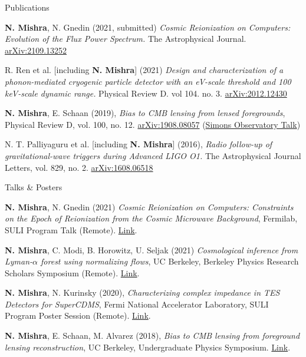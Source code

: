 \documentclass{resume} %
\begin{document}
\newpage

\begin{rSection}{Publications}

\textbf{N. Mishra}, N. Gnedin (2021, submitted) \textit{Cosmic Reionization on Computers: Evolution of the Flux Power Spectrum.} The Astrophysical Journal. \href{https://arxiv.org/abs/2109.13252}{arXiv:2109.13252}

R. Ren et al. [including \textbf{N. Mishra}] (2021) \textit{Design and characterization of a phonon-mediated cryogenic particle detector with an eV-scale threshold and 100 keV-scale dynamic range. } Physical Review D. vol 104. no. 3. \href{https://arxiv.org/abs/2012.12430}{arXiv:2012.12430}

\textbf{N. Mishra}, E. Schaan (2019), \textit{Bias to CMB lensing from lensed foregrounds}, Physical Review D, vol. 100, no. 12. \href{https://arxiv.org/abs/1908.08057}{arXiv:1908.08057} (\href{https://drive.google.com/file/d/1dWrQrhB0moSJ9O689zwzJHJY4LZAfqfd/view?usp=sharing}{Simons Observatory Talk})

N. T. Palliyaguru et al. [including \textbf{N. Mishra}] (2016),  \textit{Radio follow-up of gravitational-wave triggers during Advanced LIGO O1.} The Astrophysical Journal Letters, vol. 829, no. 2. \href{https://arxiv.org/abs/1608.06518}{arXiv:1608.06518}


\end{rSection}


\begin{rSection}{Talks \& Posters}

\textbf{N. Mishra}, N. Gnedin (2021) \textit{Cosmic Reionization on Computers: Constraints on the Epoch of Reionization from the Cosmic Microwave Background}, Fermilab, SULI Program Talk (Remote). \href{https://drive.google.com/file/d/1N6gzkKZhJ5ys09r0dTMGPrxB3Cuptzy0/view?usp=sharing}{Link}.

\textbf{N. Mishra}, C. Modi, B. Horowitz, U. Seljak (2021) \textit{Cosmological inference from Lyman-$\alpha$ forest using normalizing flows}, UC Berkeley, Berkeley Physics Research Scholars Symposium (Remote). \href{https://drive.google.com/file/d/1XuXI_SQHKejJCku6RJHtCKTVew9w3axV/view?usp=sharing}{Link}.

\textbf{N. Mishra}, N. Kurinsky (2020), \textit{Characterizing complex impedance in TES Detectors for SuperCDMS}, Fermi National Accelerator Laboratory, SULI Program Poster Session (Remote). \href{https://drive.google.com/file/d/1nKGlg7HyUcKixctRa59Tt69s8TmLjG-P/view?usp=sharing}{Link}.


\textbf{N. Mishra}, E. Schaan, M. Alvarez (2018), \textit{Bias to CMB lensing from foreground lensing reconstruction}, UC Berkeley, Undergraduate Physics Symposium. \href{https://drive.google.com/file/d/18AW06Ywywsk3P1AyXzOskSAr6hfvv9An/view?usp=sharing}{Link}.

\end{rSection}
\end{document}
